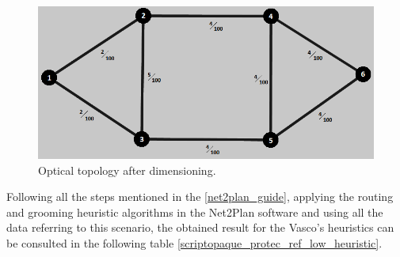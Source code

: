 \begin{figure}[H]
\centering
\includegraphics[width=13cm]{sdf/heuristic/opaque_protection/low/optical_topology_low}
\caption{Optical topology after dimensioning.}
\label{optical_topology_protec_ref_low_heuristic}
\end{figure}

Following all the steps mentioned in the \ref{net2plan_guide}, applying the routing and grooming heuristic algorithms in the Net2Plan software and using all the data referring to this scenario, the obtained result for the Vasco's heuristics can be consulted in the following table \ref{scriptopaque_protec_ref_low_heuristic}.


